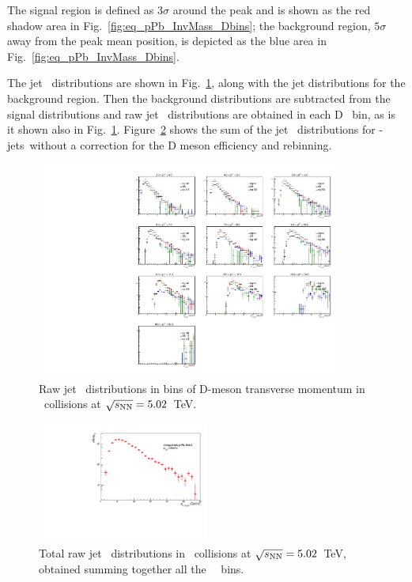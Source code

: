 The signal region is defined as $3\sigma$ around the peak and is shown as the red shadow area in Fig.~\ref{fig:eq_pPb_InvMass_Dbins};
the background region, $5\sigma$ away from the peak mean position, is depicted as the blue area in Fig.~\ref{fig:eq_pPb_InvMass_Dbins}.

The jet \pt\ distributions are shown in Fig.~\ref{fig:eq_pPb_signBkgJet_Dbins}, along with the jet distributions for the background region. 
Then the background distributions are subtracted from the signal distributions and raw jet \pt\ distributions are obtained in each D \pt\ bin, as is it shown also in Fig.~\ref{fig:eq_pPb_signBkgJet_Dbins}.
Figure~\ref{fig:eq_pPb_signBkgJet_tot} shows the sum of the jet \pt\ distributions for \Dstar-jets\ without a correction for the D meson efficiency and rebinning.

\begin{figure}[bth]
\centering
\includegraphics[width=0.9\textwidth]{pPbplots/plotsSB_noEff_pt3_noDetails/jetRawSpectrumFASTwoSDD_pTD3}
\caption{Raw jet \pt\ distributions in bins of D-meson transverse momentum in \pPb\ collisions at $\sqrt{s_{\rm NN}}=5.02$~TeV.}
\label{fig:eq_pPb_signBkgJet_Dbins}
\end{figure}

\begin{figure}[bth]
\centering
\includegraphics[width=0.5\textwidth]{pPbplots/plotsSB_noEff_pt3_noDetails/jetPtSpectrum_SB_FASTwoSDD_pTD3}
\caption{Total raw jet \pt\ distributions in \pPb\ collisions at $\sqrt{s_{\rm NN}}=5.02$~TeV, obtained summing together all the \Dstar\ \pt\ bins.}
\label{fig:eq_pPb_signBkgJet_tot}
\end{figure}

